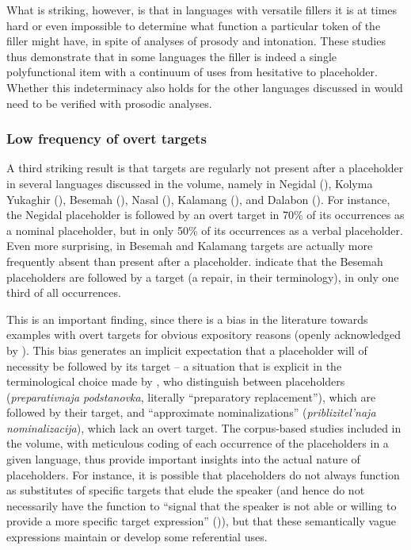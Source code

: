 \documentclass[output=paper]{langscibook}
\begin{document}
What is striking, however, is that in languages with versatile fillers it is at times hard or even impossible to determine what function a particular token of the filler might have, in spite of analyses of prosody and intonation. These studies thus demonstrate that in some languages the filler is indeed a single polyfunctional item with a continuum of uses from hesitative to placeholder. Whether this indeterminacy also holds for the other languages discussed in  would need to be verified with prosodic analyses. 

\subsubsection{Low frequency of overt targets}\label{sec:intro:9.2.3}

A third striking result is that targets are regularly not present after a placeholder in several languages discussed in the volume, namely in Negidal (\citeauthor{chapters/pakendorf}), Kolyma Yukaghir (\citeauthor{chapters/ventayol_boada}), Besemah (\citeauthor{chapters/mcdonnell_billings}), Nasal (\citeauthor{chapters/billings_mcdonnell}), Kalamang (\citeauthor{chapters/visser}), and Dalabon (\citeauthor{chapters/ponsonnet}). For instance, the Negidal placeholder is followed by an overt target in 70\% of its occurrences as a nominal placeholder, but in only 50\% of its occurrences as a verbal placeholder. Even more surprising, in Besemah and Kalamang targets are actually more frequently absent than present after a placeholder. \citeauthor{chapters/mcdonnell_billings} indicate that the Besemah placeholders are followed by a target (a repair, in their terminology), in only one third of all occurrences. 

This is an important finding, since there is a bias in the literature towards examples with overt targets for obvious expository reasons (openly acknowledged by \citealt{Dimock2010}). This bias generates an implicit expectation that a placeholder will of necessity be followed by its target – a situation that is explicit in the terminological choice made by \citet{KhurshudyanPodlesskaya2006}, who distinguish between placeholders (\textit{preparativnaja podstanovka}, literally “preparatory replacement”), which are followed by their target, and “approximate nominalizations” (\textit{priblizitel’naja nominalizacija}), which lack an overt target. The corpus-based studies included in the volume, with meticulous coding of each occurrence of the placeholders in a given language, thus provide important insights into the actual nature of placeholders. For instance, it is possible that placeholders do not always function as substitutes of specific targets that elude the speaker (and hence do not necessarily have the function to “signal that the speaker is not able or willing to provide a more specific target expression” (\citealt[300]{Hennecke2022})), but that these semantically vague expressions maintain or develop some referential uses. 
\end{document}
